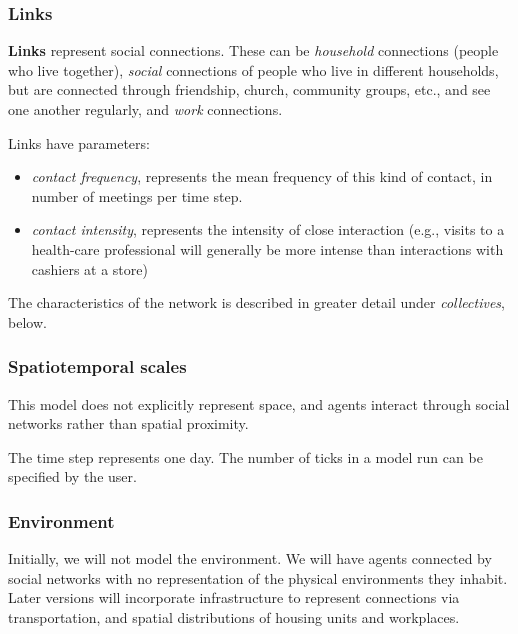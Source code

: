 \documentclass[
]{article}
\providecommand{\tightlist}{%
  \setlength{\itemsep}{0pt}\setlength{\parskip}{0pt}}
\begin{document}
\hypertarget{links}{%
\subsubsection{Links}\label{links}}

\textbf{Links} represent social connections. These can be
\emph{household} connections (people who live together), \emph{social}
connections of people who live in different households, but are
connected through friendship, church, community groups, etc., and see
one another regularly, and \emph{work} connections.

Links have parameters:

\begin{itemize}
\tightlist
\item
  \emph{contact frequency}, represents the mean frequency of this kind
  of contact, in number of meetings per time step.
\item
  \emph{contact intensity}, represents the intensity of close
  interaction (e.g., visits to a health-care professional will generally
  be more intense than interactions with cashiers at a store)
\end{itemize}

The characteristics of the network is described in greater detail under
\emph{collectives}, below.

\hypertarget{spatiotemporal-scales}{%
\subsubsection{Spatiotemporal scales}\label{spatiotemporal-scales}}

This model does not explicitly represent space, and agents interact
through social networks rather than spatial proximity.

The time step represents one day. The number of ticks in a model run can
be specified by the user.

\hypertarget{environment}{%
\subsubsection{Environment}\label{environment}}

Initially, we will not model the environment. We will have agents
connected by social networks with no representation of the physical
environments they inhabit. Later versions will incorporate
infrastructure to represent connections via transportation, and spatial
distributions of housing units and workplaces.
\end{document}
